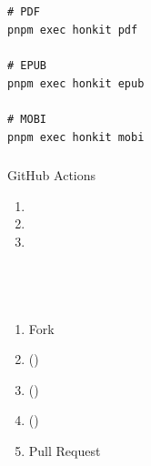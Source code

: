 \hypertarget{section-17}{%
\subsection{}\label{section-17}}

\hypertarget{section-18}{%
\subsubsection{}\label{section-18}}

\begin{lstlisting}[style=terminal]
# PDF
pnpm exec honkit pdf

# EPUB
pnpm exec honkit epub

# MOBI
pnpm exec honkit mobi
\end{lstlisting}

\hypertarget{section-19}{%
\subsubsection{}\label{section-19}}

GitHub Actions

\begin{enumerate}
\def\labelenumi{\arabic{enumi}.}
\item
\item
\item
\end{enumerate}

\hypertarget{section-20}{%
\subsection{🤝}\label{section-20}}

\begin{enumerate}
\def\labelenumi{\arabic{enumi}.}
\tightlist
\item
  Fork
\item
  ()
\item
  ()
\item
  ()
\item
  Pull Request
\end{enumerate}

\hypertarget{section-21}{%
\subsubsection{}\label{section-21}}

